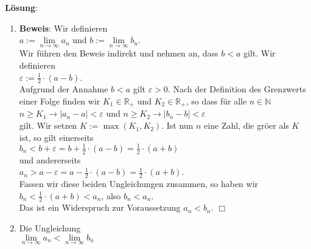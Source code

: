 \documentclass{article}
\newcommand{\ds}{\displaystyle}
\newcommand{\qed}{\hspace*{\fill} $\Box$}
\newcommand{\solution}{\vspace*{0.2cm}

\noindent
\textbf{L\"osung}: }
\begin{document}
\solution 
\begin{enumerate}
\item \textbf{Beweis}:  Wir definieren 
      \\[0.2cm]
      \hspace*{1.3cm}
      $a := \lim\limits_{n \rightarrow \infty} a_n$ \quad und \quad
      $b := \lim\limits_{n \rightarrow \infty} b_n$.
      \\[0.2cm]
      Wir f\"uhren den Beweis indirekt und nehmen an, dass $b < a$ gilt.  Wir definieren 
      \\[0.2cm]
      \hspace*{1.3cm}
      $\ds\varepsilon := \frac{1}{2} \cdot (a - b)$.
      \\[0.2cm]
      Aufgrund der Annahme $b < a$ gilt $\varepsilon > 0$.  Nach der Definition des Grenzwerts einer
      Folge finden wir $K_1 \in \mathbb{R}_+$ und $K_2 \in \mathbb{R}_+$, so dass f\"ur alle
      $n\in\mathbb{N}$ 
      \\[0.2cm]
      \hspace*{1.3cm}
      $n \geq K_1 \rightarrow |a_n - a| < \varepsilon$ \quad und \quad
      $n \geq K_2 \rightarrow |b_n - b| < \varepsilon$
      \\[0.2cm]
      gilt.  Wir setzen $K := \max(K_1,K_2)$.  Ist nun $n$ eine Zahl, die gr\"o\3er als $K$ ist, so gilt einerseits
      \\[0.2cm]
      \hspace*{1.3cm}
      $\ds b_n < b + \varepsilon = b + \frac{1}{2} \cdot (a - b) = \frac{1}{2} \cdot (a + b)$
      \\[0.2cm]
      und andererseits 
      \\[0.2cm]
      \hspace*{1.3cm}
      $\ds a_n > a - \varepsilon = a - \frac{1}{2} \cdot (a - b) = \frac{1}{2} \cdot (a + b)$.
      \\[0.2cm]
      Fassen wir diese beiden Ungleichungen zusammen, so haben wir
      \\[0.2cm]
      \hspace*{1.3cm}
      $\ds b_n < \frac{1}{2} \cdot (a + b) < a_n$, \quad also \quad $b_n < a_n$.
      \\[0.2cm]
      Das ist ein Widerspruch zur Voraussetzung $a_n < b_n$. 
      \qed
\item Die Ungleichung
      \\[0.2cm]
      \hspace*{1.3cm}
      $\lim\limits_{n \rightarrow \infty} a_n < \lim\limits_{n \rightarrow \infty} b_n$

\end{enumerate}
\end{document}
